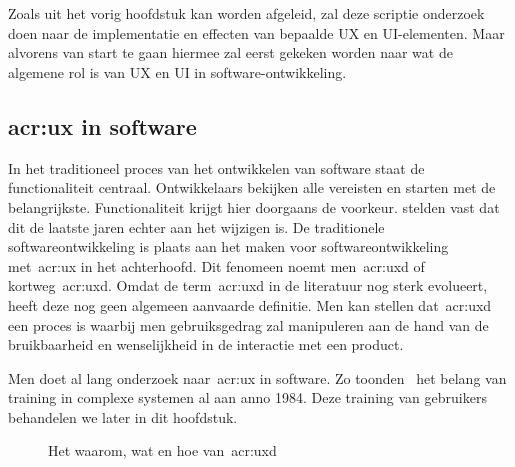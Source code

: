 \chapter{}
\label{ch:stand-van-zaken}


Zoals uit het vorig hoofdstuk kan worden afgeleid, zal deze scriptie onderzoek doen naar de implementatie en effecten van bepaalde UX en UI-elementen. Maar alvorens van start te gaan hiermee zal eerst gekeken worden naar wat de algemene rol is van UX en UI in software-ontwikkeling.

\section{\acrlong{acr:ux} in software}
\label{sec:user-experience-in-software}

In het traditioneel proces van het ontwikkelen van software staat de functionaliteit centraal. Ontwikkelaars bekijken alle vereisten en starten met de belangrijkste. Functionaliteit krijgt hier doorgaans de voorkeur. \textcite{Harutyunyan2019} stelden vast dat dit de laatste jaren echter aan het wijzigen is. De traditionele softwareontwikkeling is plaats aan het maken voor softwareontwikkeling met~\acrlong{acr:ux} in het achterhoofd. Dit fenomeen noemt men~\acrfull{acr:uxd} of kortweg~\acrshort{acr:uxd}. Omdat de term~\acrshort{acr:uxd} in de literatuur nog sterk evolueert, heeft deze nog geen algemeen aanvaarde definitie. Men kan stellen dat~\acrlong{acr:uxd} een proces is waarbij men gebruiksgedrag zal manipuleren aan de hand van de bruikbaarheid en wenselijkheid in de interactie met een product.

Men doet al lang onderzoek naar~\acrlong{acr:ux} in software. Zo toonden~\textcite{Carroll1984} het belang van training in complexe systemen al aan anno 1984. Deze training van gebruikers behandelen we later in dit hoofdstuk.

\begin{figure}[h]
    \centering
    \def\svgwidth{.8\columnwidth}
    
    \caption{Het waarom, wat en hoe van~\acrlong{acr:uxd}}
    \label{fig:ux-waarom-wat-hoe}
\end{figure}

